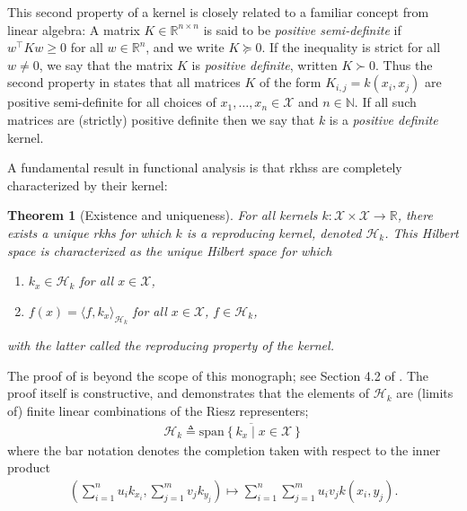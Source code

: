 \documentclass[12pt,paper=letter]{scrreprt}
\newtheorem{theorem}{Theorem}[chapter]
\def\defeq{\triangleq} %
\begin{document}
\noindent This second property of a kernel is closely related to a familiar concept from linear algebra:
A matrix $K \in \mathbb{R}^{n \times n}$ is said to be \emph{positive semi-definite} if $w^\top K w \geq 0$ for all $w \in \mathbb{R}^n$, and we write $K \succeq 0$.
If the inequality is strict for all $w \neq 0$, we say that the matrix $K$ is \emph{positive definite}, written $K \succ 0$.
Thus the second property in  states that all matrices $K$ of the form $K_{i,j} = k(x_i, x_j)$ are positive semi-definite for all choices of $x_1,\dots,x_n \in \mathcal{X}$ and $n \in \mathbb{N}$.
If all such matrices are (strictly) positive definite then we say that $k$ is a \emph{positive definite} kernel.

A fundamental result in functional analysis is that \acp{rkhs} are completely characterized by their kernel: 

\begin{theorem}[Existence and uniqueness]
\label{thm: existence rkhs}
For all kernels $k : \mathcal{X} \times \mathcal{X} \rightarrow \mathbb{R}$, there exists a unique \ac{rkhs} for which $k$ is a reproducing kernel, denoted $\mathcal{H}_k$.
This Hilbert space is characterized as the unique Hilbert space for which
\begin{enumerate}
    \item $k_x \in \mathcal{H}_k$ for all $x \in \mathcal{X}$,
    \item $f(x) = \langle f , k_x \rangle_{\mathcal{H}_k}$ for all $x \in \mathcal{X}$, $f \in \mathcal{H}_k$,
\end{enumerate}
with the latter called the \emph{reproducing property} of the kernel.
\end{theorem}

\noindent The proof of  is beyond the scope of this monograph; see Section 4.2 of \citet{steinwart2008support}.
The proof itself is constructive, and demonstrates that the elements of $\mathcal{H}_k$ are (limits of) finite linear combinations of the Riesz representers;
\begin{align*}
    \mathcal{H}_k \defeq \overline{ \mathrm{span}\left\{ k_x \; | \; x \in \mathcal{X} \right\} }
\end{align*}
where the bar notation denotes the completion taken with respect to the inner product 
\begin{align*}
    \left( \sum_{i=1}^n u_i k_{x_i} , \sum_{j=1}^m v_j k_{y_j} \right) \mapsto \sum_{i=1}^n \sum_{j=1}^m u_i v_j k(x_i,y_j) .
\end{align*}
\end{document}

